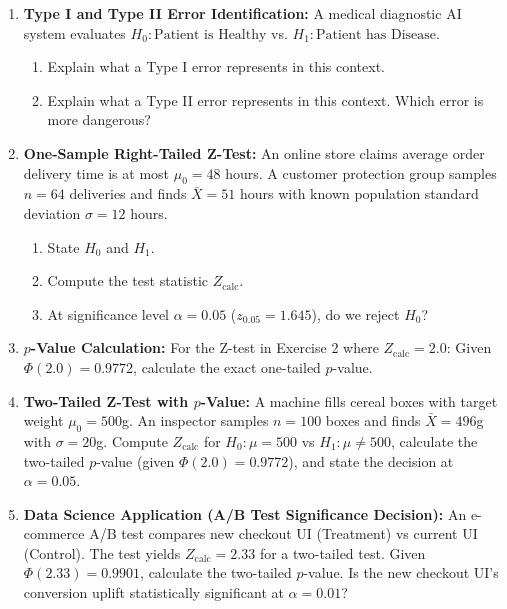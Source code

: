 \begin{enumerate}
\item \textbf{Type I and Type II Error Identification:} A medical diagnostic AI system evaluates $H_0 \colon \text{Patient is Healthy}$ vs. $H_1 \colon \text{Patient has Disease}$.
    \begin{enumerate}
        \item Explain what a Type I error represents in this context.
        \item Explain what a Type II error represents in this context. Which error is more dangerous?
    \end{enumerate}

\item \textbf{One-Sample Right-Tailed Z-Test:} An online store claims average order delivery time is at most $\mu_0 = 48$ hours. A customer protection group samples $n = 64$ deliveries and finds $\bar{X} = 51$ hours with known population standard deviation $\sigma = 12$ hours.
    \begin{enumerate}
        \item State $H_0$ and $H_1$.
        \item Compute the test statistic $Z_{\text{calc}}$.
        \item At significance level $\alpha = 0.05$ ($z_{0.05} = 1.645$), do we reject $H_0$?
    \end{enumerate}

\item \textbf{$p$-Value Calculation:} For the Z-test in Exercise 2 where $Z_{\text{calc}} = 2.0$:
    Given $\Phi(2.0) = 0.9772$, calculate the exact one-tailed $p$-value.

\item \textbf{Two-Tailed Z-Test with $p$-Value:} A machine fills cereal boxes with target weight $\mu_0 = 500$g. An inspector samples $n = 100$ boxes and finds $\bar{X} = 496$g with $\sigma = 20$g.
    Compute $Z_{\text{calc}}$ for $H_0 \colon \mu = 500$ vs $H_1 \colon \mu \neq 500$, calculate the two-tailed $p$-value (given $\Phi(2.0) = 0.9772$), and state the decision at $\alpha = 0.05$.

\item \textbf{Data Science Application (A/B Test Significance Decision):} An e-commerce A/B test compares new checkout UI (Treatment) vs current UI (Control). The test yields $Z_{\text{calc}} = 2.33$ for a two-tailed test.
    Given $\Phi(2.33) = 0.9901$, calculate the two-tailed $p$-value. Is the new checkout UI's conversion uplift statistically significant at $\alpha = 0.01$?
\end{enumerate}

